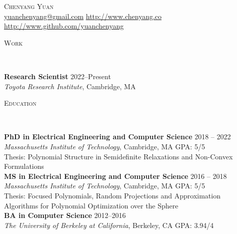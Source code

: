 \documentclass[9pt]{article}
\newenvironment{changemargin}[2]{%
  \begin{list}{}{%
      \setlength{\topsep}{0pt}%
      \setlength{\leftmargin}{#1}%
      \setlength{\rightmargin}{#2}%
      \setlength{\listparindent}{\parindent}%
      \setlength{\itemindent}{\parindent}%
      \setlength{\parsep}{\parskip}%
    }%
  \item[]}{\end{list}
}
\newcommand{\lineover}{
  \begin{changemargin}{-0.05in}{-0.05in}
    \vspace*{-8pt}
    \hrulefill \\
    \vspace*{-2pt}
  \end{changemargin}
}
\newcommand{\header}[1]{
  \begin{changemargin}{-0.5in}{-0.5in}
    \scshape{#1}\\
    \lineover
  \end{changemargin}
}
\newcommand{\contact}[2]{
  \begin{changemargin}{-0.5in}{-0.5in}
    \begin{center}
      {\Large \scshape {#1}}\\ \smallskip
      {#2}\\ \smallskip
    \end{center}
  \end{changemargin}
}
\newenvironment{body} {
  \vspace*{-16pt}
  \begin{changemargin}{-0.25in}{-0.5in}
  }
  {\end{changemargin}
}
\begin{document}
\contact{Chenyang Yuan}{\url{yuanchenyang@gmail.com} \quad
  \url{http://www.chenyang.co} \quad \url{http://www.github.com/yuanchenyang}
}
\header{Work}
\begin{body}
  \vspace{14pt}
  \textbf{Research Scientist } \hfill  2022--Present\\
  \emph{Toyota Research Institute}, Cambridge, MA  \\
\end{body}

\header{Education}
\begin{body}
  \vspace{14pt}
  \textbf{PhD in Electrical Engineering and Computer Science } \hfill  2018 -- 2022\\
  \emph{Massachusetts Institute of Technology}, Cambridge, MA{} \hfill GPA: 5/5 \\
  Thesis: Polynomial Structure in Semidefinite Relaxations and Non-Convex Formulations \\

  \vspace{5pt}
  \textbf{MS in Electrical Engineering and Computer Science } \hfill  2016 -- 2018 \\
  \emph{Massachusetts Institute of Technology}, Cambridge, MA{} \hfill GPA: 5/5 \\
  Thesis: Focused Polynomials, Random Projections and Approximation Algorithms
  for Polynomial Optimization over the Sphere \\

  \vspace{5pt}
  \textbf{BA in Computer Science} \hfill  2012--2016 \\
  \emph{The University of Berkeley at California}, Berkeley, CA{} \hfill GPA: 3.94/4 \\
\end{body}
\smallskip
\end{document}
